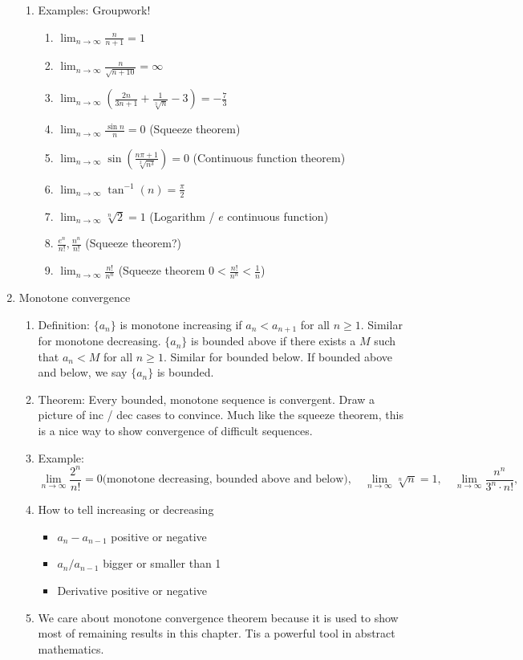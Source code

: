 \documentclass{article}
\newcommand{\ds}{\displaystyle}
\begin{document}
\begin{enumerate}
\begin{enumerate}
\item Examples: Groupwork!
\begin{enumerate}
\item 
$ \ds
\lim_{n\rightarrow \infty} \frac{n}{n+1} =  1
$
\item 
$ \ds
\lim_{n\rightarrow \infty} \frac{n}{\sqrt{n+10}} = \infty
$
\item 
$ \ds
\lim_{n\rightarrow \infty} \left(\frac{2n}{3n+1} + \frac{1}{\sqrt[3]{n}}-3\right) = -\frac{7}{3}
$
\item 
$ \ds
\lim_{n\rightarrow \infty} \frac{\sin n}{n} = 0
$ (Squeeze theorem)
\item 
$ \ds
\lim_{n\rightarrow \infty} \sin\left(\frac{n\pi +1 }{\sqrt[2]{n^3}}\right) = 0
$ (Continuous function theorem)
\item 
$ \ds
\lim_{n\rightarrow \infty} \tan^{-1}(n) = \frac{\pi}{2}
$
\item 
$ \ds
\lim_{n\rightarrow \infty}\sqrt[n]{2} = 1
$ (Logarithm / $e$ continuous function)
\item 
$ \ds
\frac{e^n}{n!}, \frac{n^n}{n!}
$ (Squeeze theorem?)
\item 
$ \ds
\lim_{n\rightarrow \infty} \frac{n!}{n^n}
$ (Squeeze theorem $ 0 < \frac{n!}{n^n} < \frac{1}{n}$)
\end{enumerate}
\end{enumerate}

\item Monotone convergence
\begin{enumerate}

\item Definition: $\{a_n\}$ is monotone increasing if $a_n < a_{n+1}$ for all $n\geq 1$. Similar for monotone decreasing.  
$\{a_n\}$ is bounded above if there exists a $M$ such that $a_n < M$ for all $n \geq 1$. Similar for bounded below. If bounded above and below, we say $\{a_n\}$ is bounded.
\item Theorem: Every bounded, monotone sequence is convergent. Draw a picture of inc / dec cases to convince. Much like the squeeze theorem, this is a nice way to show convergence of difficult sequences.
\item Example:
\[
\lim_{n\rightarrow \infty} \frac{2^n}{n!} = 0 \text{(monotone decreasing, bounded above and below)}, \quad
\lim_{n\rightarrow \infty} \sqrt[n]{n} = 1, \quad
\lim_{n\rightarrow \infty} \frac{n^n}{3^n\cdot n!}, 
\]
\item How to tell increasing or decreasing
\begin{itemize}	
\item $a_n-a_{n-1}$ positive or negative
\item $a_n/a_{n-1}$ bigger or smaller than 1
\item Derivative positive or negative
\end{itemize}
\item We care about monotone convergence theorem because it is used to show most of remaining results in this chapter. Tis a powerful tool in abstract mathematics.
\end{enumerate}


\end{enumerate}
\end{document}
